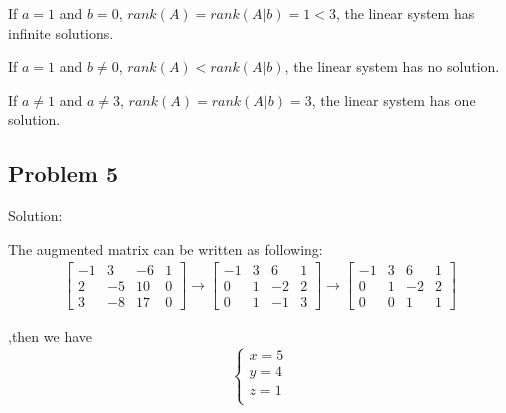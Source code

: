 \documentclass[letterpaper, 11pt]{article}
\newcommand{\1}{\mathds{1}}	%
\theoremstyle{definition}
\begin{document}
If $a = 1$ and $b = 0$, $rank(A)=rank(A|b) =1 < 3$, the linear system has infinite solutions.

If $a = 1$ and $b \neq 0$, $rank(A) < rank(A|b)$, the linear system has no solution.

If $a \neq 1$ and $a \neq 3$,  $rank(A)=rank(A|b) = 3$, the linear system has one solution.


\subsection*{Problem 5}

Solution:

The augmented matrix can be written as following:
\begin{align*}
    \left[\begin{array}{ccc|c}
                  -1 & 3  & -6 & 1 \\
                  2  & -5 & 10 & 0 \\
                  3  & -8 & 17 & 0
              \end{array}\right] \to  \left[\begin{array}{ccc|c}
                                                -1 & 3 & 6  & 1 \\
                                                0  & 1 & -2 & 2 \\
                                                0  & 1 & -1 & 3
                                            \end{array}\right] \to \left[\begin{array}{ccc|c}
                                                                             -1 & 3 & 6  & 1 \\
                                                                             0  & 1 & -2 & 2 \\
                                                                             0  & 0 & 1  & 1
                                                                         \end{array}\right]
\end{align*}

,then we have \begin{equation*}
    \left\{\begin{array}{l}
        x = 5 \\
        y = 4 \\
        z = 1 \\
    \end{array}\right.
\end{equation*}
\end{document}
